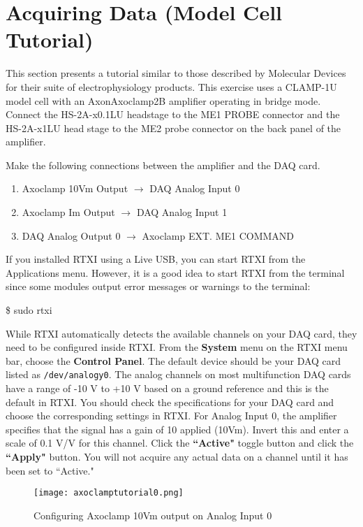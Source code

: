 \section{Acquiring Data (Model Cell Tutorial)}

This section presents a tutorial similar to those described by Molecular Devices for their suite of electrophysiology products. This exercise uses a CLAMP-1U model cell with an Axon\tm Axoclamp\tm 2B amplifier operating in bridge mode. Connect the HS-2A-x0.1LU headstage to the ME1 PROBE connector and the HS-2A-x1LU head stage to the ME2 probe connector on the back panel of the amplifier.

 Make the following connections between the amplifier and the DAQ card. 
\begin{enumerate}
\item Axoclamp 10Vm Output $\rightarrow$ DAQ Analog Input 0
\item Axoclamp Im Output $\rightarrow$ DAQ Analog Input 1
\item DAQ Analog Output 0 $\rightarrow$ Axoclamp EXT. ME1 COMMAND
\end{enumerate}

 If you installed RTXI using a Live USB, you can start RTXI from the Applications menu. However, it is a good idea to start RTXI from the terminal since some modules output error messages or warnings to the terminal: 
\begin{example}
\$ sudo rtxi
\end{example}
\vspace{1cm}
 While RTXI automatically detects the available channels on your DAQ card, they need to be configured inside RTXI. From the \textbf{System} menu on the RTXI menu bar, choose the \textbf{Control Panel}. The default device should be your DAQ card listed as \texttt{/dev/analogy0}. The analog channels on most multifunction DAQ cards have a range of -10 V to +10 V based on a ground reference and this is the default in RTXI. You should check the specifications for your DAQ card and choose the corresponding settings in RTXI. For Analog Input 0, the amplifier specifies that the signal has a gain of 10 applied (10Vm). Invert this and enter a scale of 0.1 V/V for this channel. Click the \textbf{``Active"} toggle button and click the \textbf{``Apply"} button. You will not acquire any actual data on a channel until it has been set to ``Active."
\begin{figure}[h]
\begin{center}
\texttt{[image: axoclamptutorial0.png]} 
\caption[Axoclamp Tutorial: Analog Input 0]{Configuring Axoclamp 10Vm output on Analog Input 0} 
\end{center}
\label{fig:axoclamptutorial0}
\end{figure}

